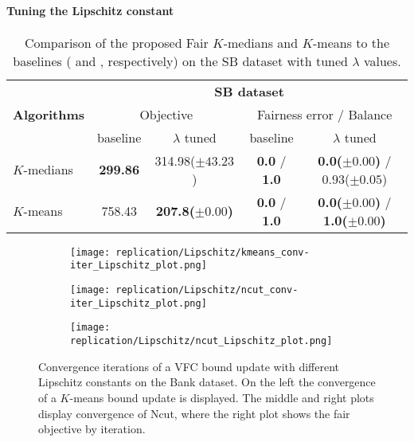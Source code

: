 \paragraph{Tuning the Lipschitz constant}\label{ssec:tunelambdalipschitz}
\begin{table}[]
	\small
	\centering
	\begin{tabular}{|l|c|c|c|c|}
		\hline
		& \multicolumn{4}{c|}{\textbf{SB dataset}} \\
		\cline{2-5}
		\textbf{Algorithms} & \multicolumn{2}{c|}{Objective} &   \multicolumn{2}{c|}{Fairness error / Balance} \\ \cline{2-5}
		& baseline & $\lambda$ tuned & baseline & $\lambda$ tuned \\
		\hline
		$K$-medians & \textbf{299.86} & 314.98($\pm 43.23$) & \textbf{0.0} / \textbf{1.0} & \textbf{0.0($\pm 0.00$)} / 0.93($\pm 0.05$) \\
		$K$-means & 758.43 & \textbf{207.8($\pm 0.00$)} & \textbf{0.0} / \textbf{1.0} & \textbf{0.0($\pm 0.00$)} / \textbf{1.0($\pm 0.00$)} \\
		\hline
	\end{tabular}
	\caption{Comparison of the proposed Fair $K$-medians and $K$-means to the baselines (\cite{backurs2019scalable} and \cite{bera2019fair}, respectively) on the SB dataset with tuned $\lambda$ values.}
	\label{tab:comparison_baselineVSlmbda-tuned}
\end{table}



\begin{figure}
	\centering
	\begin{subfigure}{0.25\linewidth}
		\centering
		\texttt{[image: replication/Lipschitz/kmeans\_conv-iter\_Lipschitz\_plot.png]}
		\label{fig:Bank_kmeans_Lipschitz_bar}
	\end{subfigure}
	\begin{subfigure}{0.25\linewidth}
		\centering
		\texttt{[image: replication/Lipschitz/ncut\_conv-iter\_Lipschitz\_plot.png]}
		\label{fig:Bank_ncut_Lipschitz_bar}
	\end{subfigure}
	\begin{subfigure}{0.25\linewidth}
		\centering
		\texttt{[image: replication/Lipschitz/ncut\_Lipschitz\_plot.png]}
		\label{fig:Bank_ncut_Lipschitz}
	\end{subfigure}    
	\caption{Convergence iterations of a VFC bound update with different Lipschitz constants on the Bank dataset. On the left the convergence of a $K$-means bound update is displayed. The middle and right plots display convergence of Ncut, where the right plot shows the fair objective by iteration.}
	\label{fig:Lipschitz_experiments}
\end{figure}


